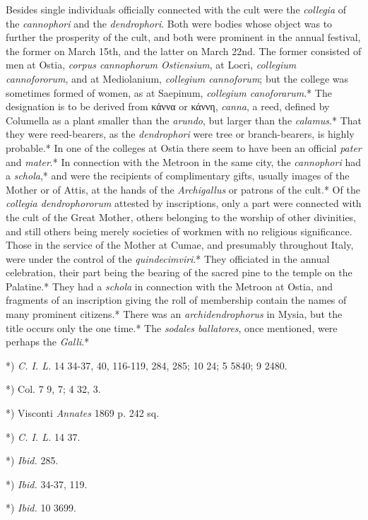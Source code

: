 \documentclass[a4paper, 11pt, oneside, polutonikogreek, english]{article}
\begin{document}
Besides single individuals officially connected with the cult were the \emph{collegia} of the \emph{cannophori} and the \emph{dendrophori}. Both were bodies whose object was to further the prosperity of the cult, and both were prominent in the annual festival, the former on March 15th, and the latter on March 22nd. The former consisted of men at Ostia, \emph{corpus cannophorum Ostiensium}, at Locri, \emph{collegium cannofororum}, and at Mediolanium, \emph{collegium cannoforum}; but the college was sometimes formed of women, as at Saepinum, \emph{collegium canoforarum}.* The designation is to be derived from κάννα or κάννη, \emph{canna}, a reed, defined by Columella as a plant smaller than the \emph{arundo}, but larger than the \emph{calamus}.* That they were reed-bearers, as the \emph{dendrophori} were tree or branch-bearers, is highly probable.* In one of the colleges at Ostia there seem to have been an official \emph{pater} and \emph{mater}.* In connection with the Metroon in the same city, the \emph{cannophori} had a \emph{schola},* and were the recipients of complimentary gifts, usually images of the Mother or of Attis, at the hands of the \emph{Archigallus} or patrons of the cult.* Of the \emph{collegia dendrophororum} attested by inscriptions, only a part were connected with the cult of the Great Mother, others belonging to the worship of other divinities, and still others being merely societies of workmen with no religious significance. Those in the service of the Mother at Cumae, and presumably throughout Italy, were under the control of the \emph{quindecimviri}.* They officiated in the annual celebration, their part being the bearing of the sacred pine to the temple on the Palatine.* They had a \emph{schola} in connection with the Metroon at Ostia, and fragments of an inscription giving the roll of membership contain the names of many prominent citizens.* There was an \emph{archidendrophorus} in Mysia, but the title occurs only the one time.* The \emph{sodales ballatores}, once mentioned, were perhaps the \emph{Galli}.*

*) \emph{C. I. L.} 14 34-37, 40, 116-119, 284, 285; 10 24; 5 5840; 9 2480.

*) Col. 7 9, 7; 4 32, 3.

*) Visconti \emph{Annates} 1869 p. 242 sq.

*) \emph{C. I. L.} 14 37.

*) \emph{Ibid.} 285.

*) \emph{Ibid.} 34-37, 119.

*) \emph{Ibid.} 10 3699.
\end{document}
